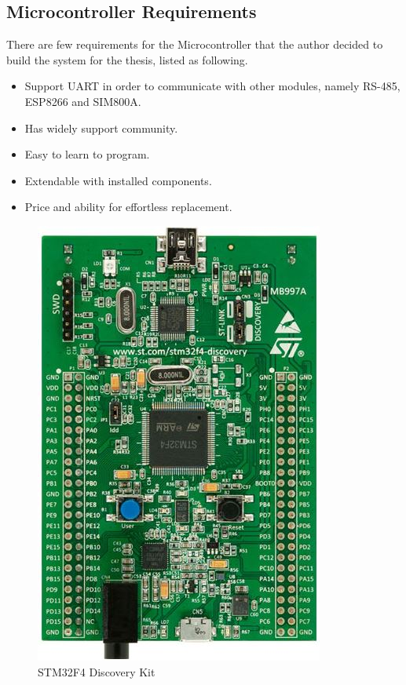     \subsection{Microcontroller Requirements}
    There are few requirements for the Microcontroller that the author decided to build the system for the thesis, listed as following.
    \begin{itemize}
        \item Support UART in order to communicate with other modules, namely RS-485, ESP8266 and SIM800A.
        \item Has widely support community.
        \item Easy to learn to program.
        \item Extendable with installed components.
        \item Price and ability for effortless replacement.
      \end{itemize}
      \begin{figure}[!ht]
        \begin{center}
        \includegraphics[scale=1]{images/stm32f4_discovery.jpg}
        \caption{STM32F4 Discovery Kit}
        \label{fig:stm32Kit}
        \end{center}
      \end{figure}

